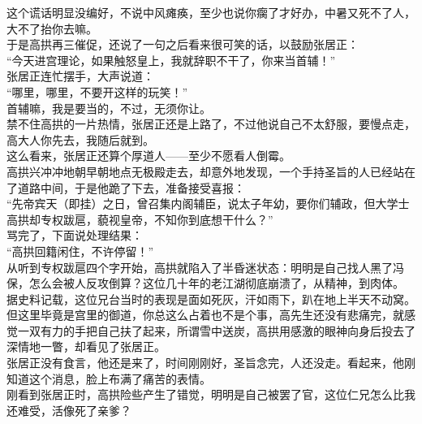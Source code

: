 \begin{multicols}{\theparacolNo}
这个谎话明显没编好，不说中风瘫痪，至少也说你瘸了才好办，中暑又死不了人，大不了抬你去嘛。\\

于是高拱再三催促，还说了一句之后看来很可笑的话，以鼓励张居正：\\

“今天进宫理论，如果触怒皇上，我就辞职不干了，你来当首辅！”\\

张居正连忙摆手，大声说道：\\

“哪里，哪里，不要开这样的玩笑！”\\

首辅嘛，我是要当的，不过，无须你让。\\

禁不住高拱的一片热情，张居正还是上路了，不过他说自己不太舒服，要慢点走，高大人你先去，我随后就到。\\

这么看来，张居正还算个厚道人——至少不愿看人倒霉。\\

高拱兴冲冲地朝早朝地点无极殿走去，却意外地发现，一个手持圣旨的人已经站在了道路中间，于是他跪了下去，准备接受喜报：\\

“先帝宾天（即挂）之日，曾召集内阁辅臣，说太子年幼，要你们辅政，但大学士高拱却专权跋扈，藐视皇帝，不知你到底想干什么？”\\

骂完了，下面说处理结果：\\

“高拱回籍闲住，不许停留！”\\

从听到专权跋扈四个字开始，高拱就陷入了半昏迷状态：明明是自己找人黑了冯保，怎么会被人反攻倒算？这位几十年的老江湖彻底崩溃了，从精神，到肉体。\\

据史料记载，这位兄台当时的表现是面如死灰，汗如雨下，趴在地上半天不动窝。\\

但这里毕竟是宫里的御道，你总这么占着也不是个事，高先生还没有悲痛完，就感觉一双有力的手把自己扶了起来，所谓雪中送炭，高拱用感激的眼神向身后投去了深情地一瞥，却看见了张居正。\\

张居正没有食言，他还是来了，时间刚刚好，圣旨念完，人还没走。看起来，他刚知道这个消息，脸上布满了痛苦的表情。\\

刚看到张居正时，高拱险些产生了错觉，明明是自己被罢了官，这位仁兄怎么比我还难受，活像死了亲爹？\\


\end{multicols}
